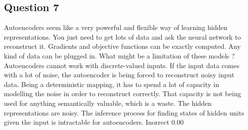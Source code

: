 \newpage \subsection*{Question 7}
Autoencoders seem like a very powerful and flexible way of learning hidden representations. You just need to get lots of data and ask the neural network to reconstruct it. Gradients and objective functions can be exactly computed. Any kind of data can be plugged in. What might be a limitation of these models ?
Autoencoders cannot work with discrete-valued inputs.			
If the input data comes with a lot of noise, the autoencoder is being forced to reconstruct noisy input data. Being a deterministic mapping, it has to spend a lot of capacity in modelling the noise in order to reconstruct correctly. That capacity is not being used for anything semantically valuable, which is a waste.			
The hidden representations are noisy.			
The inference process for finding states of hidden units given the input is intractable for autoencoders.	Inorrect	0.00	
